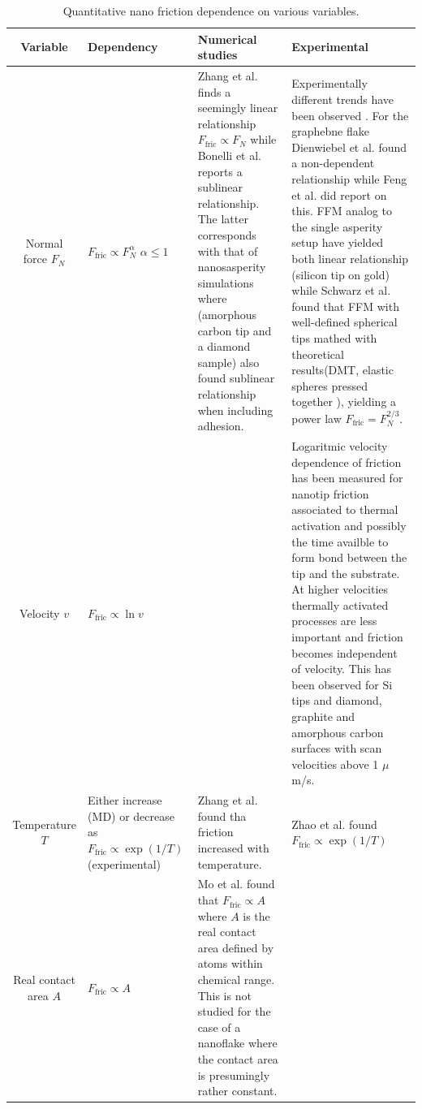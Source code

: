 \begin{table}[H]
  \begin{center}
  \caption{Quantitative nano friction dependence on various variables.}
  \label{tab:var_dep}
  \begin{tabular}{ | c | C{3cm}| m{5cm}| m{5cm}|} \hline
  \textbf{Variable} & \textbf{Dependency} & \textbf{Numerical studies} & \textbf{Experimental} \\ \hline 
  Normal force $F_N$ 
  &  
  $F_{\text{fric}} \propto F_N^{\alpha}$ \newline $\alpha \le 1$
  & Zhang et al. \cite{ma12091425} finds a seemingly linear relationship $F_{\text{fric}} \propto F_N$ while Bonelli et al. \cite{bonelli_atomistic_2009} reports a sublinear relationship. The latter corresponds with that of nanosasperity simulations where \cite{mo_friction_2009} (amorphous carbon tip and a diamond sample) also found sublinear relationship when including adhesion.
  & Experimentally different trends have been observed \cite[p. 200]{gnecco_meyer_2015}. For the graphebne flake Dienwiebel et al. \cite{DIENWIEBEL2005197} found a non-dependent relationship while Feng et al. \cite{feng_superlubric_2013} did report on this. FFM analog to the single asperity setup have yielded both linear relationship \cite{gao_frictional_2004} (silicon tip on gold) while Schwarz et al. \cite{PhysRevB.56.6987} found that FFM with well-defined spherical tips mathed with theoretical results(DMT, elastic spheres pressed together \cite[p. 200]{gnecco_meyer_2015}), yielding a power law $F_{\text{fric}} = F_N^{2/3}$. 
  \\ \hline
  Velocity $v$& $F_{\text{fric}} \propto \ln{v}$ 
  &  
  & Logaritmic velocity dependence of friction has been measured for nanotip friction \cite[p. 201]{gnecco_meyer_2015} associated to thermal activation and possibly the time availble to form bond between the tip and the substrate. At higher velocities thermally activated processes are less important and friction becomes independent of velocity. This has been observed for Si tips and diamond, graphite and amorphous carbon surfaces with scan velocities above 1 $\mu$m/s.
  \\ \hline
  Temperature $T$
  & Either increase (MD) or decrease as $F_{\text{fric}} \propto \exp{(1/T)}$  (experimental)
  &  Zhang et al. \cite{ma12091425} found tha friction increased with temperature. 
  & Zhao et al. \cite{zhao_thermally_2007} found $F_{\text{fric}} \propto \exp({1/T})$ \\ \hline
  Real contact area $A$ 
  & $F_{\text{fric}} \propto A$ 
  & Mo et al. \cite{mo_friction_2009} found that $F_{\text{fric}} \propto A$ where $A$ is the real contact area defined by atoms within chemical range. This is not studied for the case of a nanoflake where the contact area is presumingly rather constant.
  & \\ \hline
  \end{tabular}
  \end{center}
\end{table}


